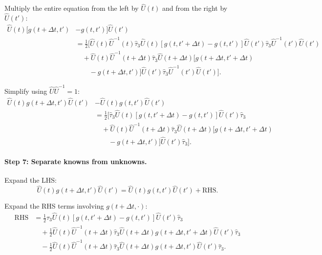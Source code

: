 \documentclass[11pt]{article}
\begin{document}
Multiply the entire equation from the left by $\hat{U}(t)$ and from the right by $\hat{U}(t')$:
\begin{equation}
\begin{split}
\hat{U}(t)[g(t+\Delta t, t') &- g(t, t')]\hat{U}(t') \\
&= \frac{1}{2} \Big[\hat{U}(t) \hat{U}^{-1}(t) \hat{\tau}_3 \hat{U}(t) [g(t, t'+\Delta t) - g(t, t')] \hat{U}(t') \hat{\tau}_3 \hat{U}^{-1}(t') \hat{U}(t') \\
&\quad + \hat{U}(t) \hat{U}^{-1}(t+\Delta t) \hat{\tau}_3 \hat{U}(t+\Delta t) [g(t+\Delta t, t'+\Delta t) \\
&\quad\quad - g(t+\Delta t, t')] \hat{U}(t') \hat{\tau}_3 \hat{U}^{-1}(t') \hat{U}(t')\Big].
\end{split}
\end{equation}

Simplify using $\hat{U} \hat{U}^{-1} = 1$:
\begin{equation}
\begin{split}
\hat{U}(t) g(t+\Delta t, t') \hat{U}(t') &- \hat{U}(t) g(t, t') \hat{U}(t') \\
&= \frac{1}{2} \Big[\hat{\tau}_3 \hat{U}(t) [g(t, t'+\Delta t) - g(t, t')] \hat{U}(t') \hat{\tau}_3 \\
&\quad + \hat{U}(t) \hat{U}^{-1}(t+\Delta t) \hat{\tau}_3 \hat{U}(t+\Delta t) [g(t+\Delta t, t'+\Delta t) \\
&\quad\quad - g(t+\Delta t, t')] \hat{U}(t') \hat{\tau}_3\Big].
\end{split}
\end{equation}

\paragraph{Step 7: Separate knowns from unknowns.}

Expand the LHS:
\begin{equation}
\hat{U}(t) g(t+\Delta t, t') \hat{U}(t') = \hat{U}(t) g(t, t') \hat{U}(t') + \text{RHS}.
\end{equation}

Expand the RHS terms involving $g(t+\Delta t, \cdot)$:
\begin{equation}
\begin{split}
\text{RHS} &= \frac{1}{2} \hat{\tau}_3 \hat{U}(t) [g(t, t'+\Delta t) - g(t, t')] \hat{U}(t') \hat{\tau}_3 \\
&\quad + \frac{1}{2} \hat{U}(t) \hat{U}^{-1}(t+\Delta t) \hat{\tau}_3 \hat{U}(t+\Delta t) g(t+\Delta t, t'+\Delta t) \hat{U}(t') \hat{\tau}_3 \\
&\quad - \frac{1}{2} \hat{U}(t) \hat{U}^{-1}(t+\Delta t) \hat{\tau}_3 \hat{U}(t+\Delta t) g(t+\Delta t, t') \hat{U}(t') \hat{\tau}_3.
\end{split}
\end{equation}
\end{document}
